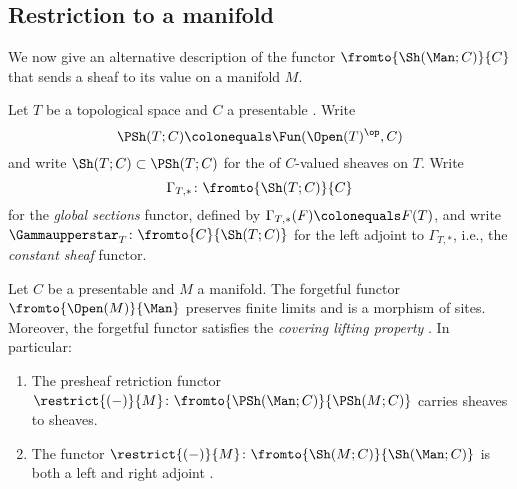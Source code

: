 
\subsection{Restriction to a manifold}\label{sec:restriction}

We now give an alternative description of the functor $ \fromto{\Sh(\Man;C)}{C} $ that sends a sheaf to its value on a manifold $ M $.

\begin{notation}
	Let $ T $ be a topological space and $ C $ a presentable \category.
	Write
	\begin{equation*}
		\PSh(T;C) \colonequals \Fun(\Open(T)^{\op},C)
	\end{equation*}
	and write $ \Sh(T;C) \subset \PSh(T;C) $ for the \category of $ C $-valued sheaves on $ T $.
	Write
	\begin{equation*}
		\Gamma_{T,*} \colon \fromto{\Sh(T;C)}{C}
	\end{equation*}
	for the \textit{global sections} functor, defined by $ \Gamma_{T,*}(F) \colonequals F(T) $, and write $ \Gammaupperstar_T \colon \fromto{C}{\Sh(T;C)} $ for the left adjoint to $ \Gamma_{T,*} $, i.e., the \textit{constant sheaf} functor.
\end{notation}

\begin{observation}\label{obs:restrictiontoamanifold}
	Let $ C $ be a presentable \category and $ M $ a manifold.
	The forgetful functor $ \fromto{\Open(M)}{\Man} $ preserves finite limits and is a morphism of sites.
	Moreover, the forgetful functor satisfies the \emph{covering lifting property} \cite[Definition A.12]{arXiv:1803.01804}.
	In particular: 
	\begin{enumerate}
		\item The presheaf retriction functor $ \restrict{(-)}{M} \colon \fromto{\PSh(\Man;C)}{\PSh(M;C)} $ carries sheaves to sheaves.
		
		\item The functor $ \restrict{(-)}{M} \colon \fromto{\Sh(M;C)}{\Sh(\Man;C)} $ is both a left and right adjoint \cite[Proposition A.12]{arXiv:1803.01804}. 
	\end{enumerate}
\end{observation}


